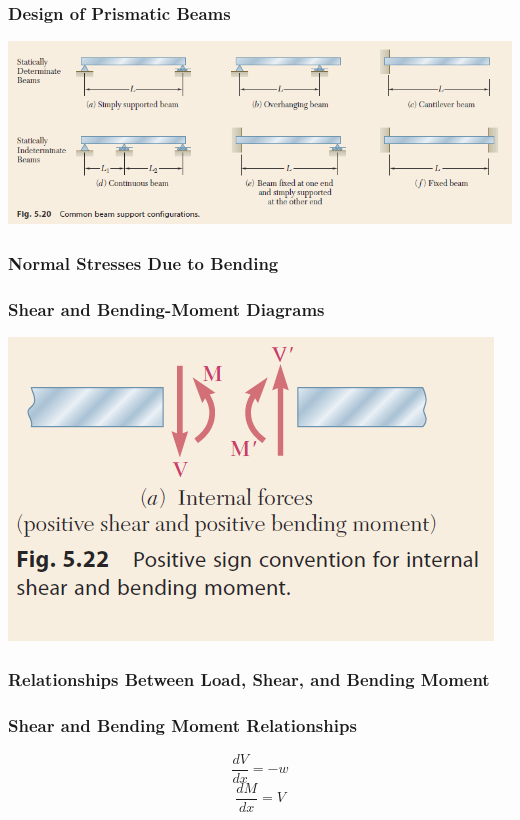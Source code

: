 \documentclass[10pt,landscape]{article}
\newenvironment{Figure}
     {\par\medskip\noindent\minipage{\linewidth}}
     {\endminipage\par\medskip}
\begin{document}
\begin{multicols}{3}
\subsubsection{Design of Prismatic Beams}
\begin{Figure}
    \centering
    \includegraphics[width=\linewidth]{TypesOfBeams.png}
\end{Figure}
\subsubsection{Normal Stresses Due to Bending}
\subsubsection{Shear and Bending-Moment Diagrams}
\begin{Figure}
    \centering
    \includegraphics[width=\linewidth]{F_5_22.png}
\end{Figure}
\subsubsection{Relationships Between Load, Shear, and Bending Moment}
\subsubsection{Shear and Bending Moment Relationships}
\begin{equation}
    \frac{dV}{dx}=-w
\end{equation}
\begin{equation}
    \frac{dM}{dx}=V
\end{equation}

\end{multicols}
\end{document}
